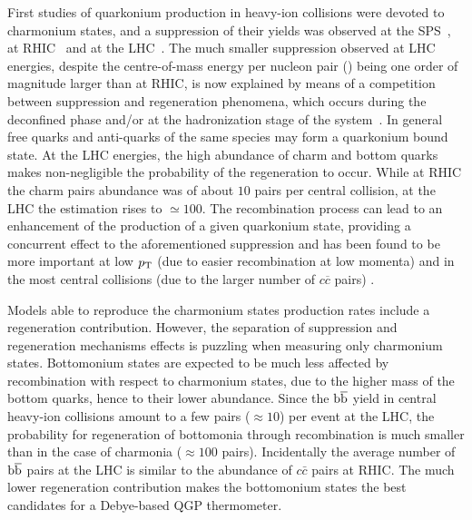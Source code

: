 First studies of quarkonium production in heavy-ion collisions were devoted to charmonium states, and a suppression of their yields was observed at the SPS~\cite{abreu:in2p3-00002434,Alessandro:2004ap,Arnaldi:2007zz}, at RHIC~\cite{Adare:2011yf,Abelev:2009qaa} and at the LHC~\cite{Abelev:2012rv,Chatrchyan:2012np,Adam:2016rdg}. 
The much smaller \jpsi suppression observed at LHC energies, despite the centre-of-mass energy per nucleon pair (\snn) being one order of magnitude larger than at RHIC, is now explained by means of a competition between suppression and regeneration phenomena, which occurs during the deconfined phase and/or at the hadronization stage of the system~\cite{BraunMunzinger:2000px,Thews:2000rj,Zhao:2011cv,Zhou:2014kka}.
In general free quarks and anti-quarks of the same species may form a quarkonium bound state.
At the LHC energies, the high abundance of charm and bottom quarks  makes non-negligible the probability of the regeneration to occur.
While at RHIC the charm pairs abundance was of about $10$ pairs per central collision, at the LHC the estimation rises to $\simeq100$.
The recombination process can lead to an enhancement of the production of a given quarkonium state, providing a concurrent effect to the aforementioned suppression and has been found to be more important at low $p_{\rm T}$ (due to easier recombination at low momenta) and in the most central collisions (due to the larger number of $c\overline{c}$ pairs) \cite{Abelev:2013ila,Adam:2015isa}.

Models able to reproduce the charmonium states production rates include a regeneration contribution.
However, the separation of suppression and regeneration mechanisms effects is puzzling when measuring only charmonium states.
Bottomonium states are expected to be much less affected by recombination with respect to charmonium states, due to the higher mass of the bottom quarks, hence to their lower abundance.
Since the  ${\rm b{\overline b}}$ yield in central heavy-ion collisions amount to a few pairs ($\approx 10$) per event at the LHC, the probability for regeneration of bottomonia through recombination is much smaller than in the case of charmonia ($\approx 100$ pairs).
Incidentally the average number of ${\rm b{\overline b}}$ pairs at the LHC is similar to the abundance of $c\bar{c}$ pairs at RHIC.
The much lower regeneration contribution makes the bottomonium states the best candidates for a Debye-based QGP thermometer.

